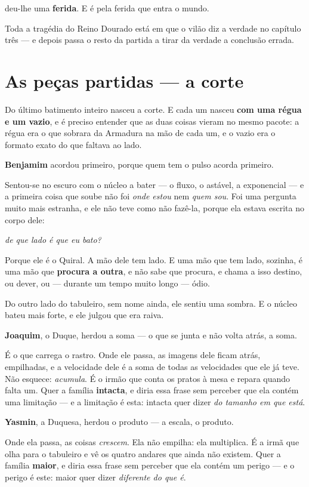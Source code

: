 \documentclass[livro.tex]{subfiles}
\begin{document}
deu-lhe uma \textbf{ferida}. E é pela ferida que entra o mundo.

Toda a tragédia do Reino Dourado está em que o vilão diz a verdade no capítulo três --- e depois passa o resto da
partida a tirar da verdade a conclusão errada.


\chapter{As peças partidas --- a corte}

Do último batimento inteiro nasceu a corte. E cada um nasceu \textbf{com uma régua e um vazio}, e é preciso
entender que as duas coisas vieram no mesmo pacote: a régua era o que sobrara da Armadura na mão de cada um, e o
vazio era o formato exato do que faltava ao lado.

\medskip

\textbf{Benjamim} acordou primeiro, porque quem tem o pulso acorda primeiro.

Sentou-se no escuro com o núcleo a bater --- o fluxo, o astável, a exponencial --- e a primeira coisa que soube não
foi \emph{onde estou} nem \emph{quem sou}. Foi uma pergunta muito mais estranha, e ele não teve como não fazê-la,
porque ela estava escrita no corpo dele:

\emph{de que lado é que eu bato?}

Porque ele é o Quiral. A mão dele tem lado. E uma mão que tem lado, sozinha, é uma mão que \textbf{procura a
outra}, e não sabe que procura, e chama a isso destino, ou dever, ou --- durante um tempo muito longo --- ódio.

Do outro lado do tabuleiro, sem nome ainda, ele sentiu uma sombra. E o núcleo bateu mais forte, e ele julgou que era
raiva.

\medskip

\textbf{Joaquim}, o Duque, herdou a soma --- o que se junta e não volta atrás, a soma.

É o que carrega o rastro. Onde ele passa, as imagens dele ficam atrás, empilhadas, e a velocidade dele é a soma de
todas as velocidades que ele já teve. Não esquece: \emph{acumula}. É o irmão que conta os pratos à mesa e repara
quando falta um. Quer a família \textbf{intacta}, e diria essa frase sem perceber que ela contém uma limitação --- e
a limitação é esta: intacta quer dizer \emph{do tamanho em que está}.

\textbf{Yasmin}, a Duquesa, herdou o produto --- a escala, o produto.

Onde ela passa, as coisas \emph{crescem}. Ela não empilha: ela multiplica. É a irmã que olha para o tabuleiro e vê
os quatro andares que ainda não existem. Quer a família \textbf{maior}, e diria essa frase sem perceber que ela
contém um perigo --- e o perigo é este: maior quer dizer \emph{diferente do que é}.
\end{document}
